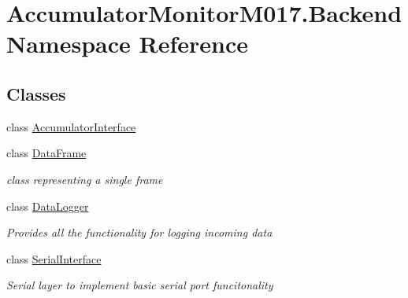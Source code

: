 \hypertarget{namespace_accumulator_monitor_m017_1_1_backend}{}\section{Accumulator\+Monitor\+M017.\+Backend Namespace Reference}
\label{namespace_accumulator_monitor_m017_1_1_backend}
\subsection*{Classes}
\begin{DoxyCompactItemize}
\item 
class \hyperlink{class_accumulator_monitor_m017_1_1_backend_1_1_accumulator_interface}{Accumulator\+Interface}
\item 
class \hyperlink{class_accumulator_monitor_m017_1_1_backend_1_1_data_frame}{Data\+Frame}
\begin{DoxyCompactList}\small\item\em class representing a single frame \end{DoxyCompactList}\item 
class \hyperlink{class_accumulator_monitor_m017_1_1_backend_1_1_data_logger}{Data\+Logger}
\begin{DoxyCompactList}\small\item\em Provides all the functionality for logging incoming data \end{DoxyCompactList}\item 
class \hyperlink{class_accumulator_monitor_m017_1_1_backend_1_1_serial_interface}{Serial\+Interface}
\begin{DoxyCompactList}\small\item\em Serial layer to implement basic serial port funcitonality \end{DoxyCompactList}\end{DoxyCompactItemize}
